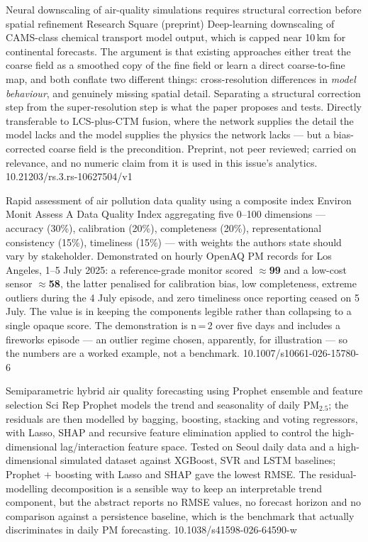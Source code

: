 \documentclass[10pt]{article}
\begin{document}
{Neural downscaling of air-quality simulations requires structural correction before spatial refinement}
{Research Square (preprint)}
{Deep-learning downscaling of CAMS-class chemical transport model output, which is
capped near 10\,km for continental forecasts. The argument is that existing approaches
either treat the coarse field as a smoothed copy of the fine field or learn a direct
coarse-to-fine map, and both conflate two different things: cross-resolution differences
in \emph{model behaviour}, and genuinely missing spatial detail. Separating a structural
correction step from the super-resolution step is what the paper proposes and tests.
Directly transferable to LCS-plus-CTM fusion, where the network supplies the detail the
model lacks and the model supplies the physics the network lacks --- but a bias-corrected
coarse field is the precondition. Preprint, not peer reviewed; carried on relevance,
and no numeric claim from it is used in this issue's analytics.}
{10.21203/rs.3.rs-10627504/v1}

{Rapid assessment of air pollution data quality using a composite index}
{Environ Monit Assess}
{A Data Quality Index aggregating five 0--100 dimensions --- accuracy (30\%), calibration
(20\%), completeness (20\%), representational consistency (15\%), timeliness (15\%) ---
with weights the authors state should vary by stakeholder. Demonstrated on hourly OpenAQ
PM records for Los Angeles, 1--5 July 2025: a reference-grade monitor scored
\textbf{$\approx$99} and a low-cost sensor \textbf{$\approx$58}, the latter penalised for
calibration bias, low completeness, extreme outliers during the 4 July episode, and zero
timeliness once reporting ceased on 5 July. The value is in keeping the components
legible rather than collapsing to a single opaque score. The demonstration is
n$\,$=$\,$2 over five days and includes a fireworks episode --- an outlier regime chosen,
apparently, for illustration --- so the numbers are a worked example, not a benchmark.}
{10.1007/s10661-026-15780-6}

{Semiparametric hybrid air quality forecasting using Prophet ensemble and feature selection}
{Sci Rep}
{Prophet models the trend and seasonality of daily PM$_{2.5}$; the residuals are then
modelled by bagging, boosting, stacking and voting regressors, with Lasso, SHAP and
recursive feature elimination applied to control the high-dimensional lag/interaction
feature space. Tested on Seoul daily data and a high-dimensional simulated dataset
against XGBoost, SVR and LSTM baselines; Prophet + boosting with Lasso and SHAP gave the
lowest RMSE. The residual-modelling decomposition is a sensible way to keep an
interpretable trend component, but the abstract reports no RMSE values, no forecast
horizon and no comparison against a persistence baseline, which is the benchmark that
actually discriminates in daily PM forecasting.}
{10.1038/s41598-026-64590-w}
\end{document}
